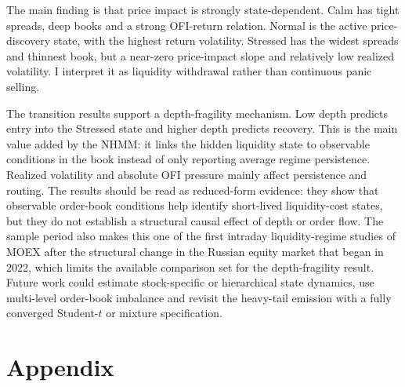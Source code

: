 \documentclass[12pt,a4paper]{article}
\begin{document}
The main finding is that price impact is strongly state-dependent. Calm has tight spreads, deep books  and a strong OFI-return relation. Normal is the active price-discovery state, with the highest return volatility. Stressed has the widest spreads and thinnest book, but a near-zero price-impact slope and relatively low realized volatility. I interpret it as liquidity withdrawal rather than continuous panic selling.

The transition results support a depth-fragility mechanism. Low depth predicts entry into the Stressed state  and higher depth predicts recovery. This is the main value added by the NHMM: it links the hidden liquidity state to observable conditions in the book instead of only reporting average regime persistence. Realized volatility and absolute OFI pressure mainly affect persistence and routing. The results should be read as reduced-form evidence: they show that observable order-book conditions help identify short-lived liquidity-cost states, but they do not establish a structural causal effect of depth or order flow. The sample period also makes this one of the first intraday liquidity-regime studies of MOEX after the structural change in the Russian equity market that began in 2022, which limits the available comparison set for the depth-fragility result. Future work could estimate stock-specific or hierarchical state dynamics, use multi-level order-book imbalance  and revisit the heavy-tail emission with a fully converged Student-\(t\) or mixture specification.

\clearpage
{}
\section*{Appendix}\label{sec:appendix}
\end{document}
